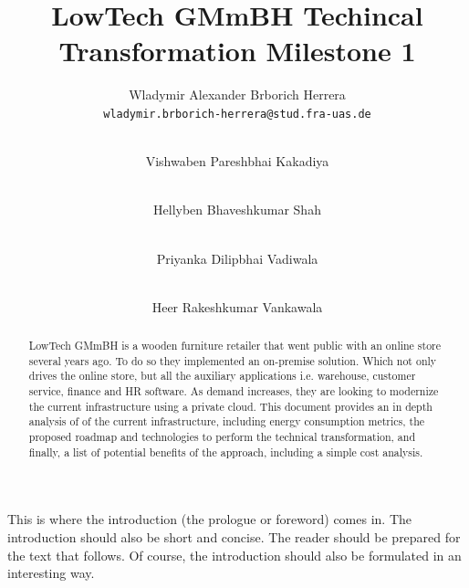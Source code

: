 \documentclass{llncs}
\newcommand{\what}{LowTech GMmBH Techincal Transformation Milestone 1}
\begin{document}
%
%
%
\mainmatter              %
%
\title{\what}
%
\author{
  Wladymir Alexander Brborich Herrera\\
  \texttt{wladymir.brborich-herrera@stud.fra-uas.de}
  \and\\ 
  Vishwaben Pareshbhai Kakadiya\\
  \texttt{}
  \and\\
  Hellyben Bhaveshkumar Shah\\
  \texttt{}
  \and\\
  Priyanka Dilipbhai Vadiwala\\
  \texttt{}
  \and\\
  Heer Rakeshkumar Vankawala\\
  \texttt{}
}
%

\maketitle              %

\begin{abstract}
  LowTech GMmBH is a wooden furniture retailer that went public with an online store several years ago. To do so they implemented an on-premise solution. Which not only drives the online store, but all the auxiliary applications i.e. warehouse, customer service, finance and HR software. As demand increases, they are looking to modernize the current infrastructure using a private cloud. This document provides an in depth analysis of of the current infrastructure, including energy consumption metrics, the proposed roadmap and technologies to perform the technical transformation, and finally, a list of potential benefits of the approach, including a simple cost analysis.  

\end{abstract}

This is where the introduction (the prologue or foreword) comes in. The introduction should also be short and concise. The reader should be prepared for the text that follows. Of course, the introduction should also be formulated in an interesting way.
\end{document}
